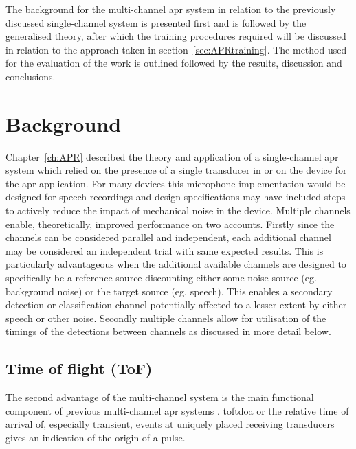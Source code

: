 The background for the multi-channel \DIFdelbegin {}\DIFdelend \DIFaddbegin \gls{apr} \DIFaddend system in relation to the previously discussed single-channel system is presented first and is followed by the generalised theory, after which the training procedures required will be discussed in relation to the approach taken in section~\ref{sec:APRtraining}. The method used for the evaluation of the work is outlined followed by the results, discussion and conclusions.

\section{Background}
Chapter~\ref{ch:APR} described the theory and application of a single-channel \DIFdelbegin {}\DIFdelend \DIFaddbegin \gls{apr} \DIFaddend system which relied on the presence of a single transducer in or on the device for the \DIFdelbegin {}\DIFdelend \DIFaddbegin \gls{apr} \DIFaddend application. For many devices this microphone implementation would be designed for speech recordings and design specifications may have included steps to actively reduce the impact of mechanical noise in the device. Multiple channels enable, theoretically, improved performance on two accounts. Firstly since the channels can be considered parallel and independent, each additional channel may be considered an independent trial with same expected results. This is particularly \DIFdelbegin {}\DIFdelend advantageous when the additional available channels are designed to specifically be a reference source discounting either some noise source (eg. background noise) or the target source (eg. speech). This enables a secondary detection or classification channel potentially affected to a lesser extent by either speech or other noise. Secondly multiple channels allow for utilisation of the timings of the detections between channels as discussed in more detail below.

\subsection{Time of flight (ToF)}
The second advantage of the multi-channel system is the main functional component of previous multi-channel \DIFdelbegin {}\DIFdelend \DIFaddbegin \gls{apr} \DIFaddend systems \cite{TouchSystems2006}\cite{US7411581}. \DIFdelbegin {}\DIFdelend \DIFaddbegin \gls{tof}\DIFadd{, }\gls{tdoa} \DIFaddend or the relative time of arrival of, especially transient, events at uniquely placed receiving transducers gives an indication of the origin of a pulse.

